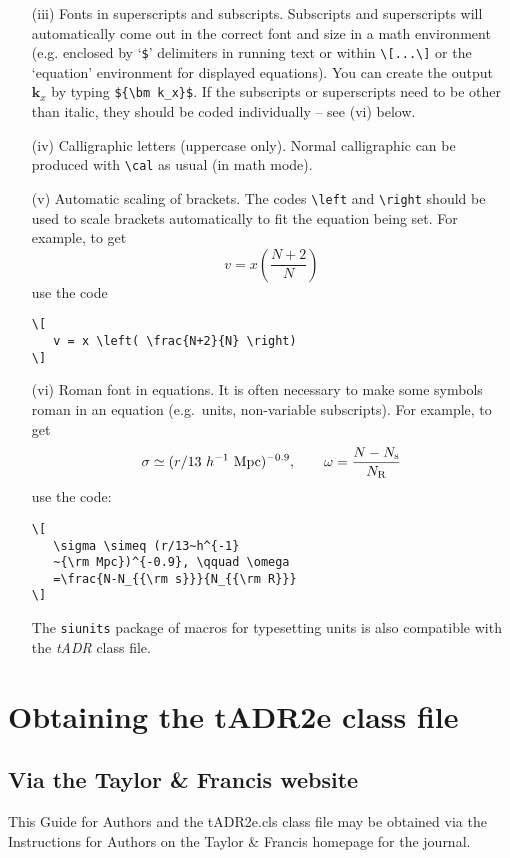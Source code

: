 \documentclass{tADR2e}
\begin{document}
\begin{enumerate}
\item[(iii)] Fonts in superscripts and subscripts. Subscripts and superscripts will automatically come  out in the correct font
and size in a math environment (e.g. enclosed by `\verb"$"'
delimiters in running text or within \verb"\[...\]" or the
`equation' environment for displayed equations). You can create
the output ${\bm k_x}$ by typing \verb"${\bm k_x}$". If the
subscripts or superscripts need to be other than italic, they
should be coded individually -- see (vi) below.

\item[(iv)] Calligraphic letters (uppercase only).
%
Normal calligraphic can be produced with \verb"\cal" as usual (in
math mode).

\item[(v)] Automatic scaling of brackets. The codes \verb"\left" and
\verb"\right" should  be used to scale brackets automatically to
fit the equation being set. For example, to get
\[
   v = x \left( \frac{N+2}{N} \right)
\]
use the code
%
\begin{verbatim}
\[
   v = x \left( \frac{N+2}{N} \right)
\]
\end{verbatim}

\item[(vi)] Roman font in equations. It is often necessary to make some
symbols roman in an equation (e.g.\ units, non-variable
subscripts). For example, to get
\[
   \sigma \simeq (r/13~h^{-1}~{\rm Mpc})^{-0.9},
   \qquad \omega = \frac{N-N_{\rm s}}{N_{\rm R}}
\]
\noindent use the code:
%
\begin{verbatim}
\[
   \sigma \simeq (r/13~h^{-1}
   ~{\rm Mpc})^{-0.9}, \qquad \omega
   =\frac{N-N_{{\rm s}}}{N_{{\rm R}}}
\]
\end{verbatim}
The {\tt siunits} package of macros for typesetting units is also compatible with the {\it tADR} class file.
\end{enumerate}


\section{Obtaining the tADR2e class file}\label{FTP}

\subsection{Via the Taylor \& Francis website}

This Guide for Authors and the tADR2e.cls class file may be obtained via the Instructions for Authors
on the Taylor \& Francis homepage for the journal.
\end{document}
